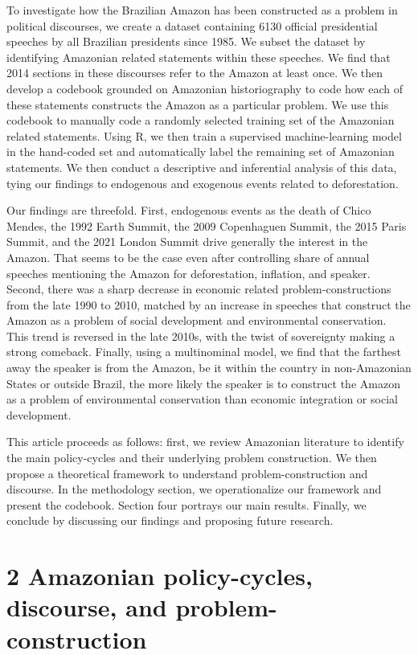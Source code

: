 \documentclass[]{interact}
\theoremstyle{plain}%
\theoremstyle{definition}
\theoremstyle{remark}
\begin{document}
To investigate how the Brazilian Amazon has been constructed as a
problem in political discourses, we create a dataset containing 6130
official presidential speeches by all Brazilian presidents since 1985.
We subset the dataset by identifying Amazonian related statements within
these speeches. We find that 2014 sections in these discourses refer to
the Amazon at least once. We then develop a codebook grounded on
Amazonian historiography to code how each of these statements constructs
the Amazon as a particular problem. We use this codebook to manually
code a randomly selected training set of the Amazonian related
statements. Using R, we then train a supervised machine-learning model
in the hand-coded set and automatically label the remaining set of
Amazonian statements. We then conduct a descriptive and inferential
analysis of this data, tying our findings to endogenous and exogenous
events related to deforestation.

Our findings are threefold. First, endogenous events as the death of
Chico Mendes, the 1992 Earth Summit, the 2009 Copenhaguen Summit, the
2015 Paris Summit, and the 2021 London Summit drive generally the
interest in the Amazon. That seems to be the case even after controlling
share of annual speeches mentioning the Amazon for deforestation,
inflation, and speaker. Second, there was a sharp decrease in economic
related problem-constructions from the late 1990 to 2010, matched by an
increase in speeches that construct the Amazon as a problem of social
development and environmental conservation. This trend is reversed in
the late 2010s, with the twist of sovereignty making a strong comeback.
Finally, using a multinominal model, we find that the farthest away the
speaker is from the Amazon, be it within the country in non-Amazonian
States or outside Brazil, the more likely the speaker is to construct
the Amazon as a problem of environmental conservation than economic
integration or social development.

This article proceeds as follows: first, we review Amazonian literature
to identify the main policy-cycles and their underlying problem
construction. We then propose a theoretical framework to understand
problem-construction and discourse. In the methodology section, we
operationalize our framework and present the codebook. Section four
portrays our main results. Finally, we conclude by discussing our
findings and proposing future research.

\hypertarget{amazonian-policy-cycles-discourse-and-problem-construction}{%
\section{2 Amazonian policy-cycles, discourse, and
problem-construction}\label{amazonian-policy-cycles-discourse-and-problem-construction}}
\end{document}
